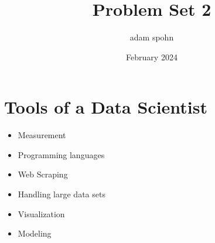 \documentclass{article}
\title{Problem Set 2}
\author{adam spohn}
\date{February 2024}
\begin{document}
\maketitle

\section{Tools of a Data Scientist}
\begin{itemize}
    \item Measurement
    \item Programming languages
    \item Web Scraping
    \item Handling large data sets
    \item Visualization
    \item Modeling
    
\end{itemize}
\end{document}
